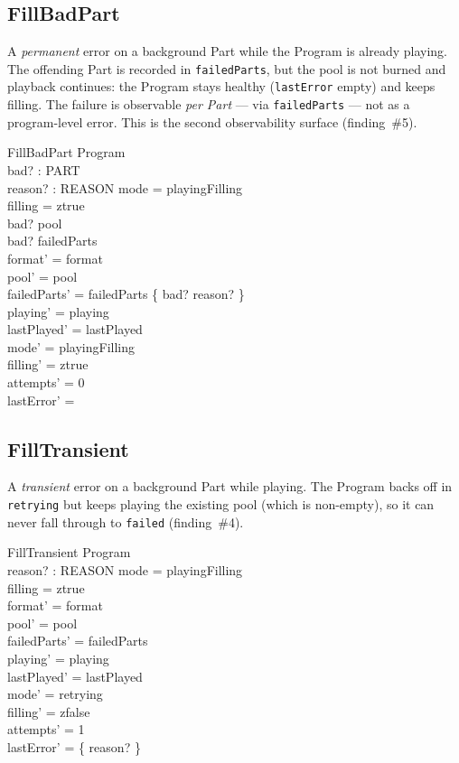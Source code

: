 \documentclass[a4paper,10pt,fleqn]{article}
\begin{document}
\subsection{FillBadPart}

A \emph{permanent} error on a background Part while the Program is already
playing. The offending Part is recorded in \texttt{failedParts}, but the pool
is not burned and playback continues: the Program stays healthy
(\texttt{lastError} empty) and keeps filling. The failure is observable
\emph{per Part} --- via \texttt{failedParts} --- not as a program-level error.
This is the second observability surface (finding~\#5).

\begin{schema}{FillBadPart}
  \Delta Program \\
  bad? : PART \\
  reason? : REASON
  \where
  mode = playingFilling \\
  filling = ztrue \\
  bad? \notin pool \\
  bad? \notin \dom failedParts \\
  format' = format \\
  pool' = pool \\
  failedParts' = failedParts \oplus \{ bad? \mapsto reason? \} \\
  playing' = playing \\
  lastPlayed' = lastPlayed \\
  mode' = playingFilling \\
  filling' = ztrue \\
  attempts' = 0 \\
  lastError' = \emptyset
\end{schema}

\subsection{FillTransient}

A \emph{transient} error on a background Part while playing. The Program backs
off in \texttt{retrying} but keeps playing the existing pool (which is
non-empty), so it can never fall through to \texttt{failed} (finding~\#4).

\begin{schema}{FillTransient}
  \Delta Program \\
  reason? : REASON
  \where
  mode = playingFilling \\
  filling = ztrue \\
  format' = format \\
  pool' = pool \\
  failedParts' = failedParts \\
  playing' = playing \\
  lastPlayed' = lastPlayed \\
  mode' = retrying \\
  filling' = zfalse \\
  attempts' = 1 \\
  lastError' = \{ reason? \}
\end{schema}
\end{document}
